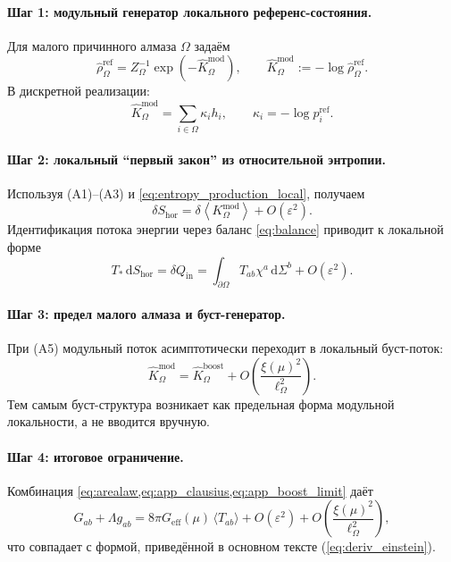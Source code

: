 \documentclass[11pt,a4paper]{article}
\newcommand{\dd}{\mathrm{d}}
\theoremstyle{definition}
\theoremstyle{plain}
\theoremstyle{remark}
\begin{document}
\paragraph{Шаг 1: модульный генератор локального референс-состояния.}
Для малого причинного алмаза $\Omega$ задаём
\begin{equation}\label{eq:app_modular_state}
\hat\rho_{\Omega}^{\mathrm{ref}}
=
Z_\Omega^{-1}\exp\!\left(-\hat K_{\Omega}^{\mathrm{mod}}\right),
\qquad
\hat K_{\Omega}^{\mathrm{mod}}:=-\log \hat\rho_{\Omega}^{\mathrm{ref}}.
\end{equation}
В дискретной реализации:
\begin{equation}\label{eq:app_modular_discrete}
\hat K_{\Omega}^{\mathrm{mod}}
=
\sum_{i\in\Omega}\kappa_i h_i,
\qquad
\kappa_i=-\log p_i^{\mathrm{ref}}.
\end{equation}

\paragraph{Шаг 2: локальный ``первый закон'' из относительной энтропии.}
Используя (A1)--(A3) и \cref{eq:entropy_production_local}, получаем
\begin{equation}\label{eq:app_firstlaw_mod}
\delta S_{\mathrm{hor}}
=
\delta\!\left\langle K_{\Omega}^{\mathrm{mod}}\right\rangle
+O(\varepsilon^2).
\end{equation}
Идентификация потока энергии через баланс \cref{eq:balance} приводит к локальной форме
\begin{equation}\label{eq:app_clausius}
T_\ast\,\dd S_{\mathrm{hor}}
=
\delta Q_{\mathrm{in}}
=
\int_{\partial\Omega}T_{ab}\chi^a\,\dd\Sigma^b
+O(\varepsilon^2).
\end{equation}

\paragraph{Шаг 3: предел малого алмаза и буст-генератор.}
При (A5) модульный поток асимптотически переходит в локальный буст-поток:
\begin{equation}\label{eq:app_boost_limit}
\hat K_{\Omega}^{\mathrm{mod}}
=
\hat K_{\Omega}^{\mathrm{boost}}
+O\!\left(\frac{\xi(\mu)^2}{\ell_\Omega^2}\right).
\end{equation}
Тем самым буст-структура возникает как предельная форма модульной локальности, а не вводится вручную.

\paragraph{Шаг 4: итоговое ограничение.}
Комбинация \cref{eq:arealaw,eq:app_clausius,eq:app_boost_limit} даёт
\begin{equation}\label{eq:app_einstein_full}
G_{ab}+\Lambda g_{ab}
=
8\pi G_{\mathrm{eff}}(\mu)\,\langle T_{ab}\rangle
+O(\varepsilon^2)
+O\!\left(\frac{\xi(\mu)^2}{\ell_\Omega^2}\right),
\end{equation}
что совпадает с формой, приведённой в основном тексте (\cref{eq:deriv_einstein}).
\end{document}

